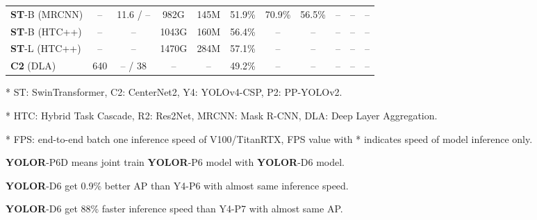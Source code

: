 \documentclass[10pt,twocolumn,letterpaper]{article}
\begin{document}
\begin{table*}[t]
\begin{threeparttable}[t]
\begin{tabular}{lcccccccccc}
		\textbf{ST}-B (MRCNN) & -- & 11.6 / -- & 982G & 145M & 51.9\% & 70.9\% & 56.5\% & -- & -- & -- \\
		\textbf{ST}-B (HTC++) & -- & -- & 1043G & 160M & 56.4\% & -- & -- & -- & -- & -- \\
		\textbf{ST}-L (HTC++) & -- & -- & 1470G & 284M & 57.1\% & -- & -- & -- & -- & -- \\
		\midrule
		\textbf{C2} (DLA) & 640 & -- / 38 & -- & -- & 49.2\% & -- & -- & -- & -- & -- \\
		\bottomrule
	\end{tabular}
	\begin{tablenotes}[flushleft]
		\footnotesize
		\item[*] ST: SwinTransformer, C2: CenterNet2, Y4: YOLOv4-CSP, P2: PP-YOLOv2.
		\item[*] HTC: Hybrid Task Cascade, R2: Res2Net, MRCNN: Mask R-CNN, DLA: Deep Layer Aggregation.
		\item[*] FPS: end-to-end batch one inference speed of V100/TitanRTX, FPS value with * indicates speed of model inference only.
		\item[] \textbf{YOLOR}-P6D means joint train \textbf{YOLOR}-P6 model with \textbf{YOLOR}-D6 model.
		\item[] \textbf{YOLOR}-D6 get 0.9\% better AP than Y4-P6 with almost same inference speed.
		\item[] \textbf{YOLOR}-D6 get 88\% faster inference speed than Y4-P7 with almost same AP.
	\end{tablenotes}
\end{threeparttable}
\end{table*}
\end{document}
